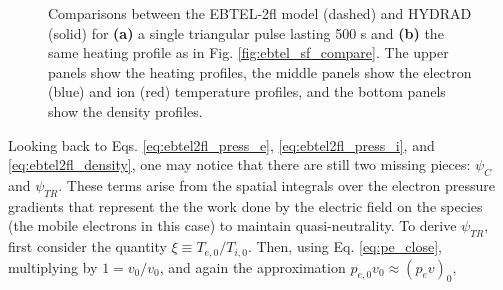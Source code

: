 %
\begin{figure}
	\centering
	\caption{Comparisons between the EBTEL-2fl model (dashed) and HYDRAD (solid) for \textbf{(a)} a single triangular pulse lasting 500 s and \textbf{(b)} the same heating profile as in Fig. \ref{fig:ebtel_sf_compare}. The upper panels show the heating profiles, the middle panels show the electron (blue) and ion (red) temperature profiles, and the bottom panels show the density profiles.}
	\label{fig:ebtel_tf_compare}
\end{figure}
%
\par Looking back to Eqs. \ref{eq:ebtel2fl_press_e}, \ref{eq:ebtel2fl_press_i}, and \ref{eq:ebtel2fl_density}, one may notice that there are still two missing pieces: $\psi_C$ and $\psi_{TR}$. These terms arise from the spatial integrals over the electron pressure gradients that represent the the work done by the electric field on the species (the mobile electrons in this case) to maintain quasi-neutrality. To derive $\psi_{TR},$ first consider the quantity $\xi\equiv T_{e,0}/T_{i,0}.$ Then, using Eq. \ref{eq:pe_close}, multiplying by $1=v_0/v_0$, and again the approximation $p_{e,0}v_0\approx(p_ev)_0$, 
